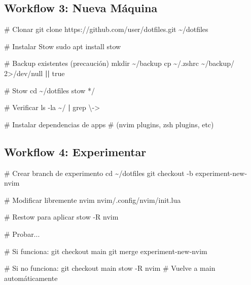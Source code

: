 \documentclass[
  doc,
  floatsintext,
  longtable,
  a4paper,
  nolmodern,
  notxfonts,
  notimes,
  12pt,
  colorlinks=true,linkcolor=blue,citecolor=blue,urlcolor=blue]{apa7}
\newenvironment{Shaded}{\begin{snugshade}}{\end{snugshade}}
\newcommand{\AttributeTok}[1]{\textcolor[rgb]{0.40,0.45,0.13}{#1}}
\newcommand{\BuiltInTok}[1]{\textcolor[rgb]{0.00,0.23,0.31}{#1}}
\newcommand{\CommentTok}[1]{\textcolor[rgb]{0.37,0.37,0.37}{#1}}
\newcommand{\DecValTok}[1]{\textcolor[rgb]{0.68,0.00,0.00}{#1}}
\newcommand{\ExtensionTok}[1]{\textcolor[rgb]{0.00,0.23,0.31}{#1}}
\newcommand{\FunctionTok}[1]{\textcolor[rgb]{0.28,0.35,0.67}{#1}}
\newcommand{\KeywordTok}[1]{\textcolor[rgb]{0.00,0.23,0.31}{\textbf{#1}}}
\newcommand{\NormalTok}[1]{\textcolor[rgb]{0.00,0.23,0.31}{#1}}
\newcommand{\OperatorTok}[1]{\textcolor[rgb]{0.37,0.37,0.37}{#1}}
\newcommand{\PreprocessorTok}[1]{\textcolor[rgb]{0.68,0.00,0.00}{#1}}
\newcommand{\StringTok}[1]{\textcolor[rgb]{0.13,0.47,0.30}{#1}}
\begin{document}
\subsection{Workflow 3: Nueva
Máquina}\label{workflow-3-nueva-muxe1quina}

\begin{Shaded}
\begin{Highlighting}[]
\CommentTok{\# Clonar}
\FunctionTok{git}\NormalTok{ clone https://github.com/user/dotfiles.git \textasciitilde{}/dotfiles}

\CommentTok{\# Instalar Stow}
\FunctionTok{sudo}\NormalTok{ apt install stow}

\CommentTok{\# Backup existentes (precaución)}
\FunctionTok{mkdir}\NormalTok{ \textasciitilde{}/backup}
\FunctionTok{cp}\NormalTok{ \textasciitilde{}/.zshrc \textasciitilde{}/backup/ }\DecValTok{2}\OperatorTok{\textgreater{}}\NormalTok{/dev/null }\KeywordTok{||} \FunctionTok{true}

\CommentTok{\# Stow}
\BuiltInTok{cd}\NormalTok{ \textasciitilde{}/dotfiles}
\ExtensionTok{stow} \PreprocessorTok{*}\NormalTok{/}

\CommentTok{\# Verificar}
\FunctionTok{ls} \AttributeTok{{-}la}\NormalTok{ \textasciitilde{}/ }\KeywordTok{|} \FunctionTok{grep} \StringTok{\textquotesingle{}\textbackslash{}{-}\textgreater{}\textquotesingle{}}

\CommentTok{\# Instalar dependencias de apps}
\CommentTok{\# (nvim plugins, zsh plugins, etc)}
\end{Highlighting}
\end{Shaded}

\subsection{Workflow 4: Experimentar}\label{workflow-4-experimentar}

\begin{Shaded}
\begin{Highlighting}[]
\CommentTok{\# Crear branch de experimento}
\BuiltInTok{cd}\NormalTok{ \textasciitilde{}/dotfiles}
\FunctionTok{git}\NormalTok{ checkout }\AttributeTok{{-}b}\NormalTok{ experiment{-}new{-}nvim}

\CommentTok{\# Modificar libremente}
\ExtensionTok{nvim}\NormalTok{ nvim/.config/nvim/init.lua}

\CommentTok{\# Restow para aplicar}
\ExtensionTok{stow} \AttributeTok{{-}R}\NormalTok{ nvim}

\CommentTok{\# Probar...}

\CommentTok{\# Si funciona:}
\FunctionTok{git}\NormalTok{ checkout main}
\FunctionTok{git}\NormalTok{ merge experiment{-}new{-}nvim}

\CommentTok{\# Si no funciona:}
\FunctionTok{git}\NormalTok{ checkout main}
\ExtensionTok{stow} \AttributeTok{{-}R}\NormalTok{ nvim  }\CommentTok{\# Vuelve a main automáticamente}
\end{Highlighting}
\end{Shaded}
\end{document}

